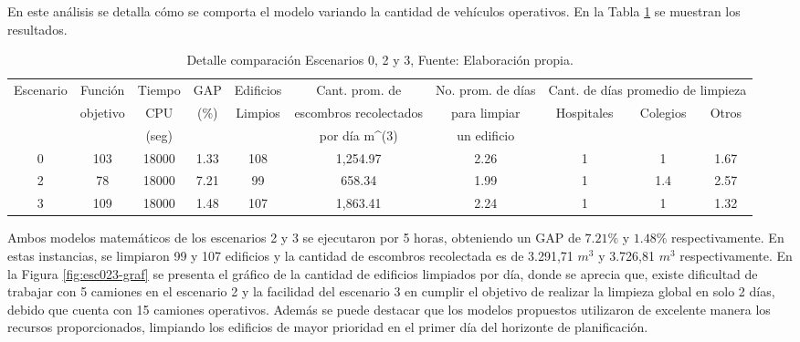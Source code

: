 \documentclass[letterpaper,conference]{IEEEtran}
\begin{document}
En este análisis se detalla cómo se comporta el modelo variando la cantidad de vehículos operativos. En la Tabla \ref{tab:comp02} se muestran los resultados.
\begin{table}[h!]
\resizebox{18cm}{!} {
\begin{tabular}{c|c|c|c|c|c|c|c|c|c}
\hline
\multirow{3}{*}{Escenario} & Función                   & Tiempo & GAP                   & Edificios                & Cant. prom. de                 & No. prom. de días & \multicolumn{3}{c|}{Cant. de días promedio de limpieza}                          \\ \cline{8-10} 
                           & \multirow{2}{*}{objetivo} & CPU    & \multirow{2}{*}{(\%)} & \multirow{2}{*}{Limpios} & escombros recolectados         & para limpiar      & \multirow{2}{*}{Hospitales} & \multirow{2}{*}{Colegios} & \multirow{2}{*}{Otros} \\
                           &                           & (seg)  &                       &                          & por día m\textasciicircum{}(3) & un edificio       &                             &                           &                        \\ \hline
0                          & 103                       & 18000  & 1.33                  & 108                      & 1,254.97                       & 2.26              & 1                           & 1                         & 1.67                   \\ 
2                          & 78                        & 18000  & 7.21                  & 99                       & 658.34                         & 1.99              &  1                       & 1.4                          & 2.57                   \\
3                          & 109                       & 18000  & 1.48                  & 107                      & 1,863.41                       & 2.24              & 1                           & 1                         & 1.32                   \\ \hline
\end{tabular}
}
\caption{Detalle comparación Escenarios 0, 2 y 3, Fuente: Elaboración propia. }
\label{tab:comp02}
\end{table}


Ambos modelos matemáticos de los escenarios 2 y 3 se ejecutaron por 5 horas, obteniendo un GAP de $7.21\%$ y $1.48\%$ respectivamente. En estas instancias, se limpiaron 99 y 107 edificios y  la cantidad de escombros recolectada es de  3.291,71 $m^{3}$  y  3.726,81 $m^{3}$ respectivamente.
En la Figura \ref{fig:esc023-graf} se presenta el gráfico de la cantidad de edificios limpiados por día, donde se aprecia que, existe dificultad de trabajar con 5 camiones en el escenario 2 y la facilidad del escenario 3 en cumplir el objetivo de realizar la limpieza global en solo 2 días, debido que cuenta con 15 camiones operativos. Además se puede destacar que los modelos propuestos utilizaron de excelente manera los recursos proporcionados, limpiando los edificios de mayor prioridad en el primer día del horizonte de  planificación.
\end{document}
